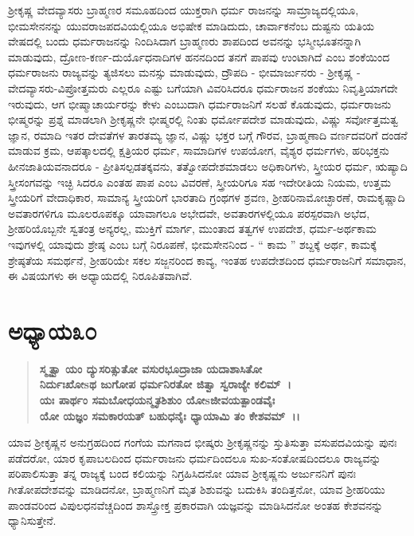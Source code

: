 ಶ‍್ರೀಕೃಷ್ಣ ವೇದವ್ಯಾಸರು ಬ್ರಾಹ್ಮಣರ ಸಮೂಹದಿಂದ ಯುಕ್ತರಾಗಿ ಧರ್ಮ ರಾಜನನ್ನು ಸಾಮ್ರಾಜ್ಯದಲ್ಲಿಯೂ, ಭೀಮಸೇನನನ್ನು ಯುವರಾಜಪದವಿಯಲ್ಲಿಯೂ ಅಭಿಷೇಕ ಮಾಡಿದುದು, ಚಾರ್ವಾಕನೆಂಬ ದುಷ್ಟನು ಯತಿಯ ವೇಷದಲ್ಲಿ ಬಂದು ಧರ್ಮರಾಜನನ್ನು ನಿಂದಿಸಿದಾಗ ಬ್ರಾಹ್ಮಣರು ಶಾಪದಿಂದ ಅವನನ್ನು ಭಸ್ಮೀಭೂತನನ್ನಾಗಿ ಮಾಡುವುದು, ದ್ರೋಣ-\-ಕರ್ಣ-ದುರ್ಯೊಧನಾದಿಗಳ ಹನನದಿಂದ ತನಗೆ ಪಾಪವು ಉಂಟಾಗಿದೆ ಎಂಬ ಶಂಕೆಯಿಂದ ಧರ್ಮರಾಜನು ರಾಜ್ಯವನ್ನು ತ್ಯಜಿಸಲು ಮನಸ್ಸು ಮಾಡುವುದು, ದ್ರೌಪದಿ - ಭೀಮಾರ್ಜುನರು - ಶ‍್ರೀಕೃಷ್ಣ - ವೇದವ್ಯಾಸರು-ವಿಪ್ರೋತ್ತಮರು ಎಲ್ಲರೂ ಎಷ್ಟು ಬಗೆಯಾಗಿ ವಿವರಿಸಿದರೂ ಧರ್ಮರಾಜನ ಶಂಕೆಯು ನಿವೃತ್ತಿಯಾಗದೇ ಇರುವುದು, ಆಗ ಭೀಷ್ಮಾಚಾರ್ಯರನ್ನು ಕೇಳು ಎಂಬುದಾಗಿ ಧರ್ಮರಾಜನಿಗೆ ಸಲಹೆ ಕೊಡುವುದು, ಧರ್ಮರಾಜನು ಭೀಷ್ಮರನ್ನು ಪ್ರಶ್ನೆ ಮಾಡಲಾಗಿ ಶ‍್ರೀಕೃಷ್ಣನೇ ಭೀಷ್ಮರಲ್ಲಿ ನಿಂತು ಧರ್ಮೋಪದೇಶ ಮಾಡುವುದು, ವಿಷ್ಣು ಸರ್ವೋತ್ತಮತ್ವ ಜ್ಞಾನ, ರಮಾದಿ ಇತರ ದೇವತೆಗಳ ತಾರತಮ್ಯ ಜ್ಞಾನ, ವಿಷ್ಣು ಭಕ್ತರ ಬಗ್ಗೆ ಗೌರವ, ಬ್ರಾಹ್ಮಣಾದಿ ವರ್ಣದವರಿಗೆ ದಂಡನೆ ಮಾಡುವ ಕ್ರಮ, ಆಪತ್ಕಾಲದಲ್ಲಿ ಕ್ಷತ್ರಿಯರ ಧರ್ಮ, ಸಾಮಾದಿಗಳ ಉಪಯೋಗ, ವೈಶ್ಯರ ಧರ್ಮಗಳು, ಹರಿಭಕ್ತನು ಹೀನಜಾತಿಯವನಾದರೂ - ಪ್ರೀತಿಸಲ್ಪಡತಕ್ಕವನು, ತತ್ವೋಪದೇಶಮಾಡಲು ಅಧಿಕಾರಿಗಳು, ಸ್ತ್ರೀಯರ ಧರ್ಮ, ಋಷ್ಯಾದಿ ಸ್ತ್ರೀಸಂಗವನ್ನು ಇಚ್ಛಿ ಸಿದರೂ ಎಂತಹ ಪಾಪ ಎಂಬ ವಿವರಣೆ, ಸ್ತ್ರೀಯರಿಗೂ ಸಹ ಇದೇರೀತಿಯ ನಿಯಮ, ಉತ್ತಮ ಸ್ತ್ರೀಯರಿಗೆ ವೇದಾಧಿಕಾರ, ಸಾಮಾನ್ಯ ಸ್ತ್ರೀಯರಿಗೆ ಭಾರತಾದಿ ಗ್ರಂಥಗಳ ಶ್ರವಣ, ಶ‍್ರೀಹರಿನಾಮೋಚ್ಛಾರಣೆ, ರಾಮಕೃಷ್ಣಾದಿ ಅವತಾರಗಳಿಗೂ ಮೂಲರೂಪಕ್ಕೂ ಯಾವಾಗಲೂ ಅಭೇದವೇ, ಅವತಾರಗಳಲ್ಲಿಯೂ ಪರಸ್ಪರವಾಗಿ ಅಭೆದ, ಶ‍್ರೀಹರಿಯೊಬ್ಬನೇ ಸ್ವತಂತ್ರ ಅನ್ಯರಲ್ಲ, ಮುಕ್ತಿಗೆ ಮಾರ್ಗ, ಮುಂತಾದ ತತ್ವಗಳ ಉಪದೇಶ, ಧರ್ಮ-ಅರ್ಥಕಾಮ ಇವುಗಳಲ್ಲಿ ಯಾವುದು ಶ್ರೇಷ್ಠ ಎಂಬ ಬಗ್ಗೆ ನಿರೂಪಣೆ, ಭೀಮಸೇನನಿಂದ - “ ಕಾಮ ” ಶಬ್ದಕ್ಕೆ ಅರ್ಥ, ಕಾಮಕ್ಕೆ ಶ್ರೇಷ್ಠತೆಯ ಸಮರ್ಥನೆ, ಶ‍್ರೀಹರಿಯೇ ಸಕಲ ಸಜ್ಜನರಿಂದ ಕಾವ್ಯ, ಇಂತಹ ಉಪದೇಶದಿಂದ ಧರ್ಮರಾಜನಿಗೆ ಸಮಾಧಾನ, ಈ ವಿಷಯಗಳು ಈ ಅಧ್ಯಾಯದಲ್ಲಿ ನಿರೂಪಿತವಾಗಿವೆ.

\vspace{-.2cm}

\section*{ಅಧ್ಯಾಯ\enginline{-}೩೦}

\begin{verse}
\textbf{ಸ್ಮೃತ್ವಾ ಯಂ ದ್ಯುಸರಿತ್ಸುತೋ ವಸುರಭೂದ್ರಾಜಾ ಯದಾಶಾಸಿತೋ}\\\textbf{ನಿರ್ದುಃಖೋsಥ ಜುಗೋಪ ಧರ್ಮನಿರತೋ ಜಿತ್ವಾ ಸ್ವರಾಜ್ಯೇ ಕಲಿಮ್~।}\\\textbf{ಯಃ ಪಾರ್ಥಂ ಸಮಬೋಧಯನ್ಮೃತಶಿಶುಂ ಯೋsಜೀವಯತ್ಪಾಂಡವೈಃ}\\\textbf{ಯೋ ಯಜ್ಞಂ ಸಮಕಾರಯತ್‌ ಬಹುಧನೈಃ ಧ್ಯಾಯಾಮಿ ತಂ ಕೇಶವಮ್~।।}
\end{verse}

ಯಾವ ಶ‍್ರೀಕೃಷ್ಣನ ಅನುಗ್ರಹದಿಂದ ಗಂಗೆಯ ಮಗನಾದ ಭೀಷ್ಕರು ಶ‍್ರೀಕೃಷ್ಣನನ್ನು ಸ್ತುತಿಸುತ್ತಾ ವಸುಪದವಿಯನ್ನು ಪುನಃ ಪಡೆದರೋ, ಯಾರ ಕೃಪಾಬಲದಿಂದ ಧರ್ಮರಾಜನು ಧರ್ಮದಿಂದಲೂ ಸುಖ-ಸಂತೋಷದಿಂದಲೂ ರಾಜ್ಯವನ್ನು ಪರಿಪಾಲಿಸುತ್ತಾ ತನ್ನ ರಾಜ್ಯಕ್ಕೆ ಬಂದ ಕಲಿಯನ್ನು ನಿಗ್ರಹಿಸಿದನೋ ಯಾವ ಶ‍್ರೀಕೃಷ್ಣನು ಅರ್ಜುನನಿಗೆ ಪುನಃ ಗೀತೋಪದೇಶವನ್ನು ಮಾಡಿದನೋ, ಬ್ರಾಹ್ಮಣನಿಗೆ ಮೃತ ಶಿಶುವನ್ನು ಬದುಕಿಸಿ ತಂದಿತ್ತನೋ, ಯಾವ ಶ‍್ರೀಹರಿಯು ಪಾಂಡವರಿಂದ ವಿಪುಲಧನವೆಚ್ಚದಿಂದ ಶಾಸ್ತ್ರೋಕ್ತ ಪ್ರಕಾರವಾಗಿ ಯಜ್ಞವನ್ನು ಮಾಡಿಸಿದನೋ ಅಂತಹ ಕೇಶವನನ್ನು ಧ್ಯಾನಿಸುತ್ತೇನೆ.

